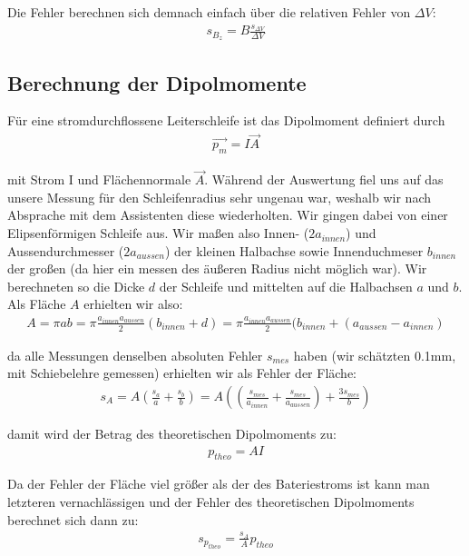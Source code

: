 \documentclass[12pt]{article}
\begin{document}
Die Fehler berechnen sich demnach einfach über die relativen Fehler von $\varDelta V$:
\begin{align}
 s_{B_z} = B \frac{s_{\varDelta V}}{\varDelta V}
\end{align}
\subsection{Berechnung der Dipolmomente}
Für eine stromdurchflossene Leiterschleife ist das Dipolmoment definiert durch
\begin{align}
 \vec{p_m}=I \vec{A}
\end{align}

mit Strom I und Flächennormale $\vec{A}$. Während der Auswertung fiel uns auf das unsere Messung für den Schleifenradius sehr ungenau war, weshalb wir nach Absprache mit dem Assistenten diese wiederholten. Wir gingen dabei von einer Elipsenförmigen Schleife aus. Wir maßen also Innen- ($2a_{innen}$) und Aussendurchmesser ($2a_{aussen}$) der kleinen Halbachse sowie Innenduchmeser $b_{innen}$ der großen (da hier ein messen des äußeren Radius nicht möglich war). Wir berechneten so die Dicke $d$ der Schleife und mittelten auf die Halbachsen $a$ und $b$. Als Fläche $A$ erhielten wir also:
\begin{align}
 A = \pi a b = \pi \frac{a_{innen} a_{aussen}}{2} (b_{innen} + d) = \pi \frac{a_{innen} a_{aussen}}{2} (b_{innen} + (a_{aussen} - a_{innen})
\end{align}

da alle Messungen denselben absoluten Fehler $s_{mes}$ haben (wir schätzten 0.1mm, mit Schiebelehre gemessen) erhielten wir als Fehler der Fläche:
\begin{align}
 s_A = A \left( \frac{s_a}{a} + \frac{s_b}{b} \right) = A \left( \left( \frac{s_{mes}}{a_{innen}} + \frac{s_{mes}}{a_{aussen}}\right) + \frac{3 s_{mes}}{b} \right)
\end{align}

damit wird der Betrag des theoretischen Dipolmoments zu:
\begin{align}
 p_{theo}=A I
\end{align}

Da der Fehler der Fläche viel größer als der des Bateriestroms ist kann man letzteren vernachlässigen und der Fehler des theoretischen Dipolmoments berechnet sich dann zu:
\begin{align}
 s_{p_{theo}}= \frac{s_A}{A} p_{theo}
\end{align}
\end{document}
